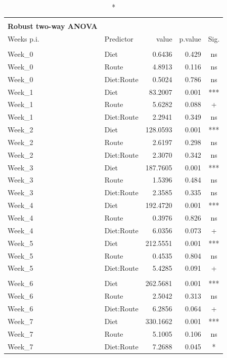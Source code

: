 \documentclass[
  12pt,
  letterpaper,
]{article}
\begin{document}
\begin{longtable}{l|lrrc}
\caption*{
{\large \textbf{Appendix Table 91}} \\ 
{\small \textbf{Robust two-way ANOVA}}
} \\ 
\toprule
\multicolumn{1}{l}{Weeks p.i.} & Predictor & value & p.value & Sig. \\ 
\midrule\addlinespace[2.5pt]
\multicolumn{5}{l}{Pre-Infection} \\ 
\midrule\addlinespace[2.5pt]
Week\_0 & Diet & 0.6436 & 0.429 & ns \\ 
Week\_0 & Route & 4.8913 & 0.116 & ns \\ 
Week\_0 & Diet:Route & 0.5024 & 0.786 & ns \\ 
Week\_1 & Diet & 83.2007 & 0.001 & *** \\ 
Week\_1 & Route & 5.6282 & 0.088 & + \\ 
Week\_1 & Diet:Route & 2.2941 & 0.349 & ns \\ 
Week\_2 & Diet & 128.0593 & 0.001 & *** \\ 
Week\_2 & Route & 2.6197 & 0.298 & ns \\ 
Week\_2 & Diet:Route & 2.3070 & 0.342 & ns \\ 
Week\_3 & Diet & 187.7605 & 0.001 & *** \\ 
Week\_3 & Route & 1.5396 & 0.484 & ns \\ 
Week\_3 & Diet:Route & 2.3585 & 0.335 & ns \\ 
Week\_4 & Diet & 192.4720 & 0.001 & *** \\ 
Week\_4 & Route & 0.3976 & 0.826 & ns \\ 
Week\_4 & Diet:Route & 6.0356 & 0.073 & + \\ 
Week\_5 & Diet & 212.5551 & 0.001 & *** \\ 
Week\_5 & Route & 0.4535 & 0.804 & ns \\ 
Week\_5 & Diet:Route & 5.4285 & 0.091 & + \\ 
\midrule\addlinespace[2.5pt]
\multicolumn{5}{l}{Post-Infestion} \\ 
\midrule\addlinespace[2.5pt]
Week\_6 & Diet & 262.5681 & 0.001 & *** \\ 
Week\_6 & Route & 2.5042 & 0.313 & ns \\ 
Week\_6 & Diet:Route & 6.2856 & 0.064 & + \\ 
Week\_7 & Diet & 330.1662 & 0.001 & *** \\ 
Week\_7 & Route & 5.1005 & 0.106 & ns \\ 
Week\_7 & Diet:Route & 7.2688 & 0.045 & * \\ 

\end{longtable}
\end{document}
